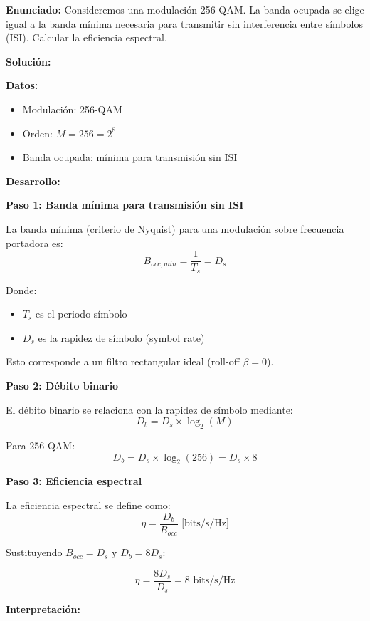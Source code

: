 \documentclass[11pt,a4paper]{article}
\begin{document}
\textbf{Enunciado:} Consideremos una modulaci\'on 256-QAM. La banda ocupada se elige igual a la banda m\'inima necesaria para transmitir sin interferencia entre s\'imbolos (ISI). Calcular la eficiencia espectral.

\vspace{0.3cm}
\textbf{Soluci\'on:}

\textbf{Datos:}
\begin{itemize}
    \item Modulaci\'on: 256-QAM
    \item Orden: $M = 256 = 2^8$
    \item Banda ocupada: m\'inima para transmisi\'on sin ISI
\end{itemize}

\textbf{Desarrollo:}

\textbf{Paso 1: Banda m\'inima para transmisi\'on sin ISI}

La banda m\'inima (criterio de Nyquist) para una modulaci\'on sobre frecuencia portadora es:
\[
B_{occ,min} = \frac{1}{T_s} = D_s
\]

Donde:
\begin{itemize}
    \item $T_s$ es el periodo s\'imbolo
    \item $D_s$ es la rapidez de s\'imbolo (symbol rate)
\end{itemize}

Esto corresponde a un filtro rectangular ideal (roll-off $\beta = 0$).

\textbf{Paso 2: D\'ebito binario}

El d\'ebito binario se relaciona con la rapidez de s\'imbolo mediante:
\[
D_b = D_s \times \log_2(M)
\]

Para 256-QAM:
\[
D_b = D_s \times \log_2(256) = D_s \times 8
\]

\textbf{Paso 3: Eficiencia espectral}

La eficiencia espectral se define como:
\[
\eta = \frac{D_b}{B_{occ}} \text{ [bits/s/Hz]}
\]

Sustituyendo $B_{occ} = D_s$ y $D_b = 8 D_s$:

\[
\eta = \frac{8 D_s}{D_s} = \boxed{8 \text{ bits/s/Hz}}
\]

\textbf{Interpretaci\'on:}
\end{document}
